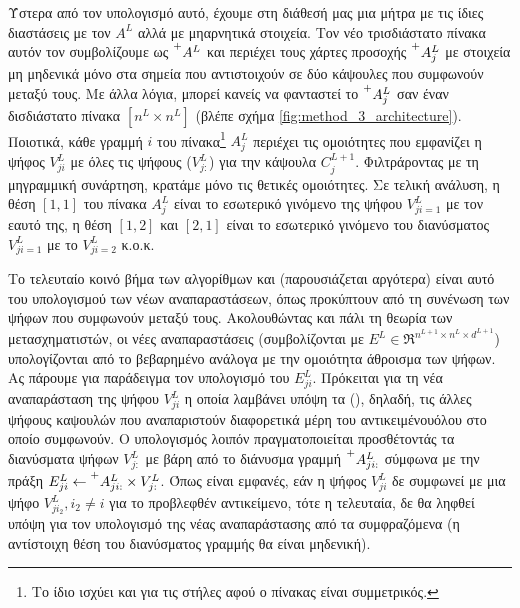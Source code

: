 Ύστερα από τον υπολογισμό αυτό, έχουμε στη διάθεσή μας μια μήτρα με τις ίδιες διαστάσεις με τον $A^L$ αλλά με μη\textendash αρνητικά στοιχεία. Τον νέο τρισδιάστατο πίνακα αυτόν τον συμβολίζουμε ως $\prescript{+}{}{A^{L}}$ και περιέχει τους χάρτες προσοχής $\prescript{+}{}{A_j^{L}}$ με στοιχεία μη μηδενικά μόνο στα σημεία που αντιστοιχούν σε δύο κάψουλες που συμφωνούν μεταξύ τους. Με άλλα λόγια, μπορεί κανείς να φανταστεί το $\prescript{+}{}{A_j^{L}}$ σαν έναν δισδιάστατο πίνακα $[n^L \times n^L]$ (βλέπε σχήμα \ref{fig:method_3_architecture}). Ποιοτικά, κάθε γραμμή $i$ του πίνακα\footnote{Το ίδιο ισχύει και για τις στήλες αφού ο πίνακας είναι συμμετρικός.} $A_j^{L}$ περιέχει τις ομοιότητες που εμφανίζει η ψήφος $V_{ji}^L$ με όλες τις ψήφους ($V_{j:}^L$) για την κάψουλα $C_j^{L+1}$. Φιλτράροντας με τη μη\textendash γραμμική συνάρτηση, κρατάμε μόνο τις θετικές ομοιότητες. Σε τελική ανάλυση, η θέση $[1,1]$ του πίνακα $A_j^{L}$ είναι το εσωτερικό γινόμενο της ψήφου $V_{ji=1}^L$ με τον εαυτό της, η θέση $[1,2]$ και $[2,1]$ είναι το εσωτερικό γινόμενο του διανύσματος $V_{ji=1}^L$ με το $V_{ji=2}^L$ κ.ο.κ.\par

Το τελευταίο κοινό βήμα των αλγορίθμων  και  (παρουσιάζεται αργότερα) είναι αυτό του υπολογισμού των νέων αναπαραστάσεων, όπως προκύπτουν από τη συνένωση των ψήφων που συμφωνούν μεταξύ τους. Ακολουθώντας και πάλι τη θεωρία των μετασχηματιστών, οι νέες αναπαραστάσεις (συμβολίζονται με $E^L \in \Re^{n^{L+1} \times n^{L} \times d^{L+1}}$) υπολογίζονται από το βεβαρημένο ανάλογα με την ομοιότητα άθροισμα των ψήφων. Ας πάρουμε για παράδειγμα τον υπολογισμό του $E^L_{ji}$. Πρόκειται για τη νέα αναπαράσταση της ψήφου $V^L_{ji}$ η οποία λαμβάνει υπόψη τα  (), δηλαδή, τις άλλες ψήφους καψουλών που αναπαριστούν διαφορετικά μέρη του αντικειμένου\textendash όλου στο οποίο συμφωνούν. Ο υπολογισμός λοιπόν πραγματοποιείται προσθέτοντάς τα διανύσματα ψήφων $V^L_{j:}$ με βάρη από το διάνυσμα γραμμή $\prescript{+}{}{A_{ji:}^{L}}$ σύμφωνα με την πράξη $E^L_{ji} \gets \prescript{+}{}{A_{ji:}^{L}} \times V^L_{j:}$. Όπως είναι εμφανές, εάν η ψήφος $V^L_{ji}$ δε συμφωνεί με μια ψήφο $V^L_{ji_2}, i_2 \neq i$ για το προβλεφθέν αντικείμενο, τότε η τελευταία, δε θα ληφθεί υπόψη για τον υπολογισμό της νέας αναπαράστασης από τα συμφραζόμενα (η αντίστοιχη θέση του διανύσματος γραμμής θα είναι μηδενική).\par

